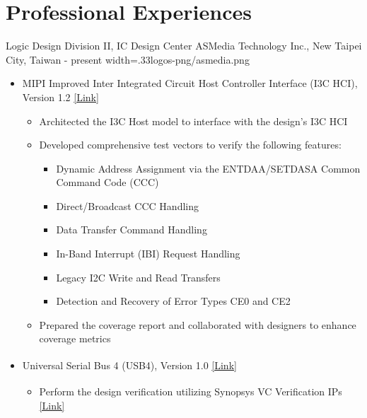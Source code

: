 \documentclass{cvclass}
\newcommand{\simplemmyy}[3]{\shortmmyyformat\formatdate{#3}{#2}{#1}}
\begin{document}
\makeinfo


\section{Professional Experiences}

    {Logic Design Division II, IC Design Center}
    {ASMedia Technology Inc., New Taipei City, Taiwan}
    {\simplemmyy{2023}{7}{17} - present}
    {width=.33\linewidth}{logos-png/asmedia.png}
    {\begin{itemize}
        \item MIPI Improved Inter Integrated Circuit Host Controller Interface (I3C HCI\textservicemark{}), Version 1.2 \href{https://www.mipi.org/specifications/i3c-hci}{[Link]}
        \begin{itemize}
            \item Architected the I3C Host model to interface with the design's I3C HCI
            \item Developed comprehensive test vectors to verify the following features:
            \begin{itemize}
                \item Dynamic Address Assignment via the ENTDAA/SETDASA Common Command Code (CCC)
                \item Direct/Broadcast CCC Handling
                \item Data Transfer Command Handling
                \item In-Band Interrupt (IBI) Request Handling
                \item Legacy I2C Write and Read Transfers
                \item Detection and Recovery of Error Types CE0 and CE2
            \end{itemize}
            \item Prepared the coverage report and collaborated with designers to enhance coverage metrics
        \end{itemize}
        \item Universal Serial Bus 4 (USB4\textsuperscript{\tiny\textregistered}),  Version 1.0 \href{https://www.usb.org/usb4}{[Link]}
        \begin{itemize}
            \item Perform the design verification utilizing Synopsys\textsuperscript{\tiny\textregistered} VC Verification IPs \href{https://www.synopsys.com/verification/verification-ip/subsystems/vc-verification-ip-usb4.html}{[Link]}

\end{itemize}
\end{itemize}}
\end{document}
